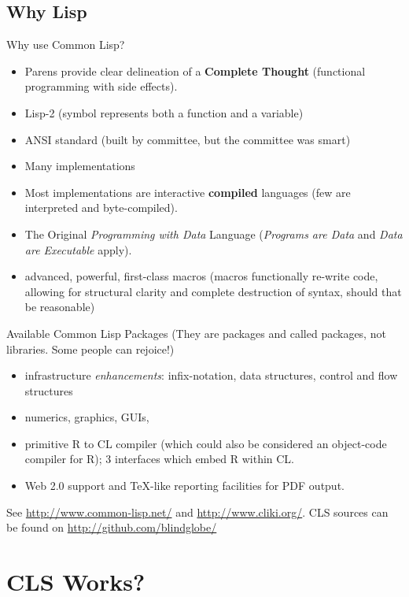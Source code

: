 \documentclass{beamer}
\begin{document}
\subsection{Why Lisp}

\begin{frame}{Why use Common Lisp?}
  \begin{itemize}
  \item Parens provide clear delineation of a \textbf{Complete
      Thought} (functional programming with side effects).
  \item Lisp-2 (symbol represents both a function and a variable)
  \item ANSI standard (built by committee, but the committee was
    smart)
  \item Many implementations
  \item Most implementations are interactive \textbf{compiled}
    languages (few are interpreted and byte-compiled).
  \item The Original \emph{Programming with Data} Language
    (\emph{Programs are Data} and \emph{Data are Executable} apply).
  \item advanced, powerful, first-class macros (macros functionally
    re-write code, allowing for structural clarity and complete
    destruction of syntax, should that be reasonable)
  \end{itemize}
\end{frame}

\begin{frame}{Available Common Lisp Packages}
  (They are packages and called packages, not libraries.  Some people
  can rejoice!)
  \begin{itemize}
  \item infrastructure \emph{enhancements}: infix-notation, data
    structures, control and flow structures
  \item numerics, graphics, GUIs, 
  \item primitive R to CL compiler (which could also be considered an
    object-code compiler for R); 3 interfaces which embed R within CL.
  \item Web 2.0 support and TeX-like reporting facilities for PDF
    output.
  \end{itemize}
  See \url{http://www.common-lisp.net/} and
  \url{http://www.cliki.org/}.  CLS sources can be found on
  \url{http://github.com/blindglobe/}
\end{frame}

\section{CLS Works?}
\label{sec:work}
\end{document}
